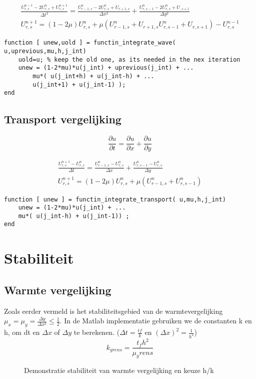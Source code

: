 \documentclass[11pt]{article} %
\begin{document}
		\begin{eqnarray}
			\frac{U_{r,s}^{n-1} - 2U_{r,s}^{n}+U_{r,s}^{n+1} }{\Delta t^2} 
			=
			\frac{U_{r-1,s}^n - 2 U_{r,s}^n + U_{r+1,s}}{\Delta x^2} + 
			\frac{U_{r,s-1}^n - 2 U_{r,s}^n + U_{,s+1} }{\Delta y^2} \\
			U_{r,s}^{n+1} = ( 1-2\mu )U_{r,s}^n + \mu (U_{r-1,s}^n  + U_{r+1,s}
			U_{r,s-1}^n  + U_{r,s+1}) - U_{r,s}^{n-1}
		\end{eqnarray}
\begin{lstlisting}[caption=Code Explicit Euler,label={lst:expl_euler}]
function [ unew,uold ] = functin_integrate_wave( u,uprevious,mu,h,j_int)
	uold=u; % keep the old one, as its needed in the nex iteration
	unew = (1-2*mu)*u(j_int) + uprevious(j_int) + ...
		mu*( u(j_int+h) + u(j_int-h) + ...
		u(j_int+1) + u(j_int-1) );
end
\end{lstlisting}
	\subsection{Transport vergelijking}
		\begin{equation}
			\frac{\partial u}{\partial t} = \frac{\partial u}{\partial x} + \frac{\partial u}{\partial y}
		\end{equation}
		
		\begin{eqnarray}
			\frac{U_{r,s}^{n+1} - U_{r,s}^n}{\Delta t} = 
			\frac{U^n_{r-1,s} -U^n_{r,s}}{\Delta x} +
			\frac{U^n_{r,s-1} -U^n_{r,s}}{\Delta y} \\
			U_{r,s}^{n+1} = (1- 2 \mu)U^n_{r,s} + \mu (U^n_{r-1,s}+U^n_{r,s-1})
		\end{eqnarray}
\begin{lstlisting}[caption=Code Explicit Euler,label={lst:expl_euler}]
function [ unew ] = functin_integrate_transport( u,mu,h,j_int)
	unew = (1-2*mu)*u(j_int) + ... 
	mu*( u(j_int-h) + u(j_int-1)) ;
end
\end{lstlisting}
\clearpage
\section{Stabiliteit}
	\subsection{Warmte vergelijking}
	Zoals eerder vermeld is het stabiliteitsgebied van de warmtevergelijking  $\mu_x=\mu_y=\frac{\Delta y}{\Delta x^2} \leq \frac{1}{2}$. In de Matlab implementatie gebruiken we de constanten k en h, om dt en $\Delta x$ of $\Delta y$ te berekenen. ($\Delta t=\frac{tf}{k}$ en $(\Delta x)^2 = \frac{1}{h^2}$)
	\begin{equation}
		k_{grens} = \frac{t_f h^2}{\mu_grens}
	\end{equation}
	\begin{figure}[H]
		\centering
		\hfill
	\caption{Demonstratie stabiliteit van warmte vergelijking en keuze h/k}
	\end{figure}
	
\end{document}
